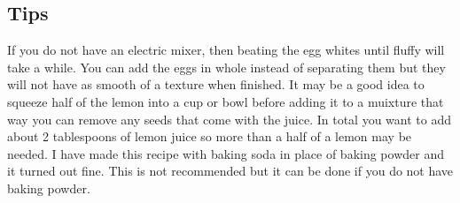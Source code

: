 \subsection*{Tips}

If you do not have an electric mixer, then beating the egg whites until fluffy will take a while. You can add the eggs in whole instead of separating them but they will not have as smooth of a texture when finished. It may be a good idea to squeeze half of the lemon into a cup or bowl before adding it to a muixture that way you can remove any seeds that come with the juice. In total you want to add about 2 tablespoons of lemon juice so more than a half of a lemon may be needed. I have made this recipe with baking soda in place of baking powder and it turned out fine. This is not recommended but it can be done if you do not have baking powder.